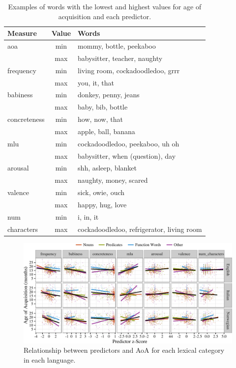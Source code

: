 \documentclass[10pt, letterpaper]{article}
\newenvironment{CodeChunk}{}{}
\begin{document}
\setlength\tabcolsep{1pt}

\begin{table}[!hb]
\centering
\begin{tabular}{lcl}
  \hline
Measure & Value & Words \\ 
  \hline
aoa & min & mommy, bottle, peekaboo \\ 
   & max & babysitter, teacher, naughty \\ 
  frequency & min & living room, cockadoodledoo, grrr \\ 
   & max & you, it, that \\ 
  babiness & min & donkey, penny, jeans \\ 
   & max & baby, bib, bottle \\ 
  concreteness & min & how, now, that \\ 
   & max & apple, ball, banana \\ 
  mlu & min & cockadoodledoo, peekaboo, uh oh \\ 
   & max & babysitter, when (question), day \\ 
  arousal & min & shh, asleep, blanket \\ 
   & max & naughty, money, scared \\ 
  valence & min & sick, owie, ouch \\ 
   & max & happy, hug, love \\ 
  num & min & i, in, it \\ 
  characters & max & cockadoodledoo, refrigerator, living room \\ 
   \hline
\end{tabular}
\caption{Examples of words with the lowest and highest values for age of acquisition and each predictor.} 
\label{tab:mytable}
\end{table}

\begin{CodeChunk}
\begin{figure}[!h]

{\centering \includegraphics{figs/data-1} 

}

\caption[Relationship between predictors and AoA for each lexical category in each language]{Relationship between predictors and AoA for each lexical category in each language.}\label{fig:data}
\end{figure}
\end{CodeChunk}
\end{document}
